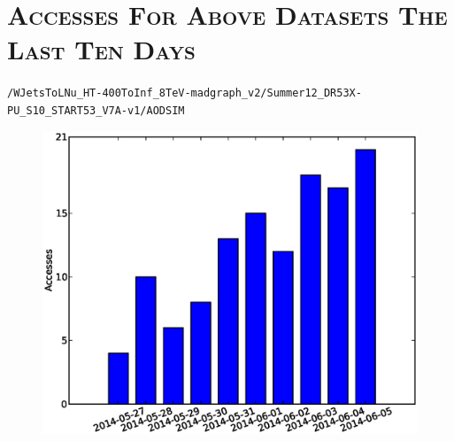 \documentclass[11pt]{article}
\begin{document}
\section*{\textsc{Accesses For Above Datasets The Last Ten Days}}

	\begin{description}
		\item \begin{alltt}/WJetsToLNu_HT-400ToInf_8TeV-madgraph_v2/Summer12_DR53X-PU_S10_START53_V7A-v1/AODSIM\end{alltt}
		\begin{figure}[h]
			\begin{center}
			\includegraphics[scale=0.6]{d1.eps}
			\end{center}
		\end{figure}
	\end{description}
\end{document}
